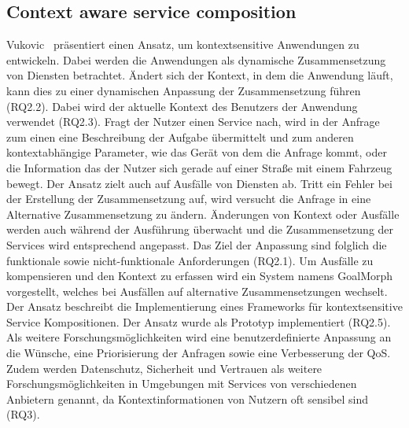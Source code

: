 \documentclass[conference,compsoc]{IEEEtran}
\begin{document}
\subsection{Context aware service composition}
Vukovic~\cite{vukovic2007context} präsentiert einen Ansatz, um kontextsensitive Anwendungen zu entwickeln. Dabei werden die Anwendungen als dynamische Zusammensetzung von Diensten betrachtet. Ändert sich der Kontext, in dem die Anwendung läuft, kann dies zu einer dynamischen Anpassung der Zusammensetzung führen (RQ2.2). Dabei wird der aktuelle Kontext des Benutzers der Anwendung verwendet (RQ2.3). Fragt der Nutzer einen Service nach, wird in der Anfrage zum einen eine Beschreibung der Aufgabe übermittelt und zum anderen kontextabhängige Parameter, wie das Gerät von dem die Anfrage kommt, oder die Information das der Nutzer sich gerade auf einer Straße mit einem Fahrzeug bewegt.
Der Ansatz zielt auch auf Ausfälle von Diensten ab. Tritt ein Fehler bei der Erstellung der Zusammensetzung auf, wird versucht die Anfrage in eine Alternative Zusammensetzung zu ändern.
Änderungen von Kontext oder Ausfälle werden auch während der Ausführung überwacht und die Zusammensetzung der Services wird entsprechend angepasst.
Das Ziel der Anpassung sind folglich die funktionale sowie nicht-funktionale Anforderungen (RQ2.1).
Um Ausfälle zu kompensieren und den Kontext zu erfassen wird ein System namens GoalMorph vorgestellt, welches bei Ausfällen auf alternative Zusammensetzungen wechselt. Der Ansatz beschreibt die Implementierung eines Frameworks für kontextsensitive Service Kompositionen. Der Ansatz wurde als Prototyp implementiert (RQ2.5).
Als weitere Forschungsmöglichkeiten wird eine benutzerdefinierte Anpassung an die Wünsche, eine Priorisierung der Anfragen sowie eine Verbesserung der QoS. Zudem werden Datenschutz, Sicherheit und Vertrauen als weitere Forschungsmöglichkeiten in Umgebungen mit Services von verschiedenen Anbietern genannt, da Kontextinformationen von Nutzern oft sensibel sind (RQ3).
\end{document}
